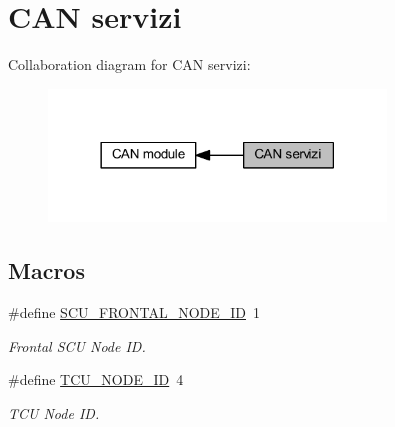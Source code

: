 \hypertarget{group___c_a_n__servizi__group}{}\section{C\+AN servizi}
\label{group___c_a_n__servizi__group}
Collaboration diagram for C\+AN servizi\+:\nopagebreak
\begin{figure}[H]
\begin{center}
\leavevmode
\includegraphics[width=254pt]{group___c_a_n__servizi__group}
\end{center}
\end{figure}
\subsection*{Macros}
\begin{DoxyCompactItemize}
\item 
\mbox{\label{group___c_a_n__servizi__group_ga8d64b6b4c0f02ebded5440c6250e03b9}} 
\#define \mbox{\hyperlink{group___c_a_n__servizi__group_ga8d64b6b4c0f02ebded5440c6250e03b9}{S\+C\+U\+\_\+\+F\+R\+O\+N\+T\+A\+L\+\_\+\+N\+O\+D\+E\+\_\+\+ID}}~1
\begin{DoxyCompactList}\small\item\em Frontal S\+CU Node ID. \end{DoxyCompactList}\item 
\mbox{\label{group___c_a_n__servizi__group_gaceef3f7366b39e88d89cb98ad8094c7b}} 
\#define \mbox{\hyperlink{group___c_a_n__servizi__group_gaceef3f7366b39e88d89cb98ad8094c7b}{T\+C\+U\+\_\+\+N\+O\+D\+E\+\_\+\+ID}}~4
\begin{DoxyCompactList}\small\item\em T\+CU Node ID. \end{DoxyCompactList}\end{DoxyCompactItemize}

